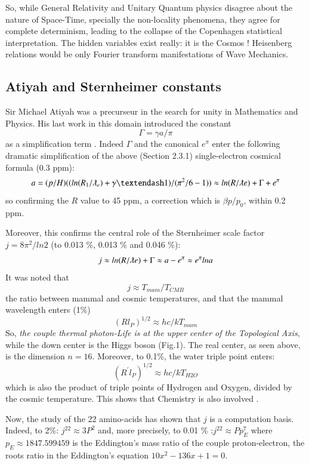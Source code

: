 \documentclass[twoside,draft]{article}
\begin{document}
\begin{sloppypar}
{So, while General Relativity and Unitary Quantum physics disagree about the nature of Space-Time, specially the non-locality phenomena, they agree for complete determinism, leading to the collapse of the
Copenhagen statistical interpretation. The hidden variables exist really: it is the Cosmos ! Heisenberg
relations would be only Fourier transform manifestations of Wave Mechanics.


\subsection{Atiyah and Sternheimer constants}
    Sir Michael Atiyah was a precurseur in the search for unity in Mathematics and Physics. His last work in this domain introduced the constant $$\Gamma = \gamma a /\pi$$ as a simplification term \cite{Atiyah1}. Indeed $\Gamma$ and the canonical $e^{\pi}$ enter the following dramatic simplification of the above (Section 2.3.1) single-electron cosmical formula (0.3 ppm):    
\begin{equation}
a = (p/H)((ln(R_1/\lambdabar_e) + \gamma – 1)/(\pi^2/6 - 1)) \approx ln(R/\lambdabar e) + \Gamma + e^{\pi}
\end{equation}
so confirming the $R$ value to 45 ppm, a correction which is $\beta p/p_0$, within 0.2 ppm.

Moreover, this confirms the central role of the Sternheimer scale factor $j = 8\pi^2/ln2$ (to 0.013 \%, 0.013 \% and 0.046 \%):
\begin{equation}
j \approx ln(R/\lambdabar e) + \Gamma \approx a - e^{\pi} \approx e^{\pi} lna
\end{equation}
It was noted \cite{Sanchez1} that $$j\approx T_{mam}/T_{CMB}$$ the ratio between mammal and cosmic temperatures, and that the mammal wavelength enters (1\%) $$(Rl_P)^{1/2}\approx hc/kT_{mam}$$ So, \textit{the couple thermal photon-Life is at the upper center of the Topological Axis}, while the down center is the Higgs boson (Fig.1). The real center, as seen above, is the dimension $n = 16$. Moreover, to 0.1\%, the water triple point enters: $$(R^{\prime}l_P)^{1/2}\approx hc/kT_{H2O}$$ which is also the product of triple points of Hydrogen and Oxygen, divided by the cosmic temperature. This shows that Chemistry is also involved \cite{Sanchez1}.

Now, the study of the 22 amino-acids \cite{Sanchez1} has shown that $j$ is a computation basis. Indeed, to 2\%: $j^{22} \approx 3 P^2 $ and, more precisely, to 0.01 \% :$j^{22} \approx Pp_E^7 $ where $ p_E \approx 1847.599459$ is the Eddington's mass ratio of the couple proton-electron, the roots ratio in the Eddington's equation $10x^2 - 136x + 1 = 0 $.

}
\end{sloppypar}
\end{document}

